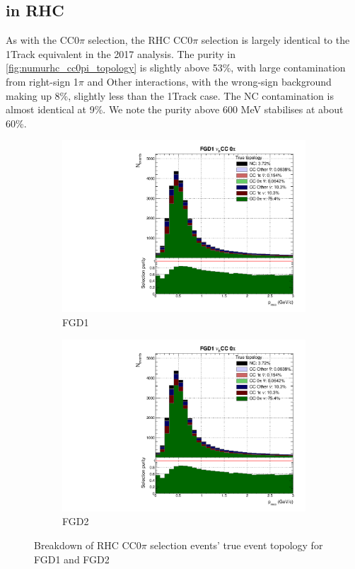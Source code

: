 \subsection{\numu in RHC}
As with the \numubar CC0$\pi$ selection, the \numu RHC CC0$\pi$ selection is largely identical to the 1Track equivalent in the 2017 analysis. The purity in \autoref{fig:numurhc_cc0pi_topology} is slightly above 53\%, with large contamination from right-sign 1$\pi$ and Other interactions, with the wrong-sign background making up 8\%, slightly less than the 1Track case. The NC contamination is almost identical at 9\%. We note the purity above 600 MeV stabilises at about 60\%.
\begin{figure}[h]
	\begin{subfigure}[t]{0.49\textwidth}
		\includegraphics[width=\textwidth,page=25, trim={0mm 0mm 0mm 9mm}, clip]{figures/mach3/2018/Selection/2018_FullNoRedNDmatrix_rebin_verbose_may_diagnostics}
		\caption{FGD1}
	\end{subfigure}
	\begin{subfigure}[t]{0.49\textwidth}
		\includegraphics[width=\textwidth,page=31, trim={0mm 0mm 0mm 9mm}, clip]{figures/mach3/2018/Selection/2018_FullNoRedNDmatrix_rebin_verbose_may_diagnostics}
		\caption{FGD2}
	\end{subfigure}
	\caption{Breakdown of \numu RHC CC0$\pi$ selection events' true event topology for FGD1 and FGD2 }
	\label{fig:numurhc_cc0pi_topology}
\end{figure}

